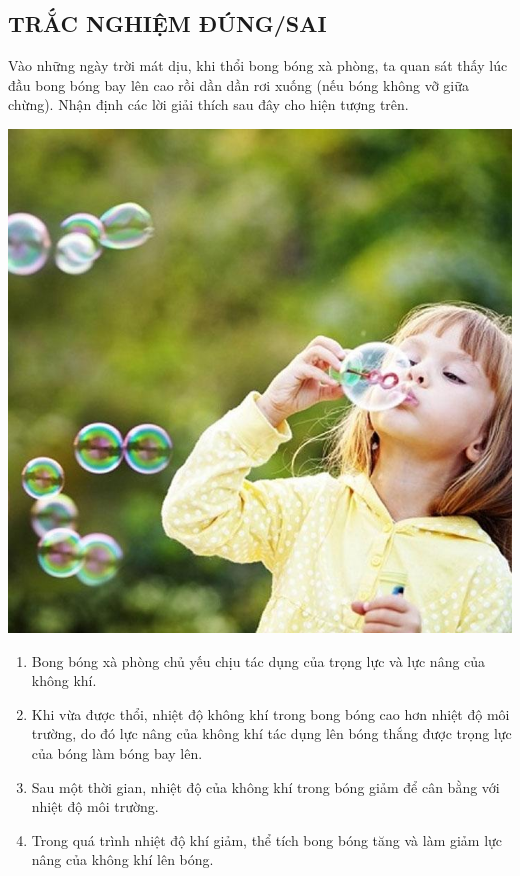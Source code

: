 \subsection{TRẮC NGHIỆM ĐÚNG/SAI}
\setcounter{ex}{0}
\begin{ex}
	Vào những ngày trời mát dịu, khi thổi bong bóng xà phòng, ta quan sát thấy lúc đầu bong bóng bay lên cao rồi dần dần rơi xuống (nếu bóng không vỡ giữa chừng). Nhận định các lời giải thích sau đây cho hiện tượng trên.
	\begin{center}
		\includegraphics[width=0.2\linewidth]{figs/VN12-Y24-PH-SYL-011P-1}
	\end{center}
	\begin{enumerate}[label=\alph*)]
		\item Bong bóng xà phòng chủ yếu chịu tác dụng của trọng lực và lực nâng của không khí.
		\item Khi vừa được thổi, nhiệt độ không khí trong bong bóng cao hơn nhiệt độ môi trường, do đó lực nâng của không khí tác dụng lên bóng thắng được trọng lực của bóng làm bóng bay lên.
		\item Sau một thời gian, nhiệt độ của không khí trong bóng giảm để cân bằng với nhiệt độ môi trường.
		\item Trong quá trình nhiệt độ khí giảm, thể tích bong bóng tăng và làm giảm lực nâng của không khí lên bóng.
	\end{enumerate}
	
\end{ex}
